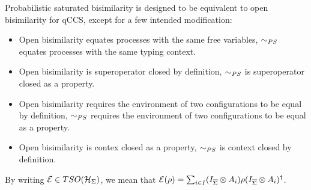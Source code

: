Probabilistic saturated bisimilarity is designed to be equivalent to open bisimilarity for qCCS, except for a few intended modification:\begin{itemize}
\item Open bisimilarity equates processes with the same free variables, $\sim_{PS}$ equates processes with the same typing context.
\item Open bisimilarity is superoperator closed by definition, $\sim_{PS}$ is superoperator closed as a property.
\item Open bisimilarity requires the environment of two configurations to be equal by definition, $\sim_{PS}$ requires the environment of two configurations to be equal as a property.
\item Open bisimilarity is contex closed as a property, $\sim_{PS}$ is context closed by definition.
\end{itemize}


By writing $\mathcal{E} \in TSO(\mathcal{H}_{\Sigma})$, we mean that $\mathcal{E}(\rho) = \sum_{i \in I} (I_{\overline{\Sigma}} \otimes A_i) \rho (I_{\overline{\Sigma}} \otimes A_i)^{\dagger}$.

